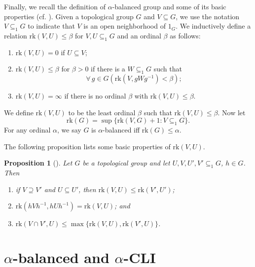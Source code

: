 \documentclass[11pt]{amsart}
\newtheorem{proposition}[theorem]{Proposition}
\theoremstyle{definition}
\theoremstyle{remark}
\numberwithin{equation}{section}
\def\hier#1{$#1$-CLI}
\def\rk{\mathrm{rk}}
\begin{document}
Finally, we recall the definition of $\alpha$-balanced group and some of its basic properties (cf. \cite[Section 2]{SAllisonAPana}). Given a topological group $G$ and $V\subseteq G$, we use the notation $V\subseteq_1G$ to indicate that $V$ is an open neighborhood of $1_G$. We inductively define a relation $\rk(V,U)\leq\beta$ for $V,U\subseteq_1 G$ and an ordinal $\beta$ as follows:
\begin{enumerate}
    \item[(1)] $\rk(V,U)=0$ if $U\subseteq V$;
    \item[(2)] $\rk(V,U)\leq\beta$ for $\beta>0$ if there is a $W\subseteq_1G$ such that $$\forall\,g\in G\left(\rk(V,gWg^{-1})<\beta\right);$$
    \item[(3)] $\rk(V,U)=\infty$ if there is no ordinal $\beta$ with $\rk(V,U)\leq\beta$.
\end{enumerate}
We define $\rk(V,U)$ to be the least ordinal $\beta$ such that $\rk(V,U)\leq\beta$. Now let
\begin{equation*}
    \rk(G)=\sup\{\rk(V,G)+1:V\subseteq_1G\}.
\end{equation*}
For any ordinal $\alpha$, we say $G$ is $\alpha$-balanced iff $\rk(G)\leq\alpha$. %

The following proposition lists some basic properties of $\rk(V,U)$.

\begin{proposition}[{\cite[Proposition 2.3]{SAllisonAPana}}]\label{basic property of rk}
    Let $G$ be a topological group and let $U,V,U',V'\subseteq_1G$,  $h\in G$. Then
    \begin{enumerate}
        \item[(1)] if $V\supseteq V'$ and $U\subseteq U'$, then $\rk(V,U)\leq\rk(V',U')$;
        \item[(2)] $\rk(hVh^{-1},hUh^{-1})=\rk(V,U)$; and
        \item[(3)] $\rk(V\cap V',U)\leq\max\{\rk(V,U),\rk(V',U)\}$.
    \end{enumerate}
\end{proposition}




\section{$\alpha$-balanced and \hier\alpha}
\end{document}
